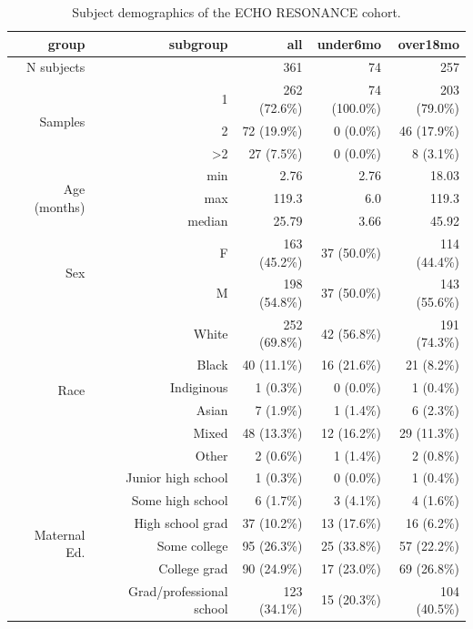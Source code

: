 \documentclass{article}
\begin{document}
\begin{table}[!htb]
    \centering
    \begin{tabular}{|r|r|r|r|r|}
      \hline\hline
      \textbf{group} & \textbf{subgroup} & \textbf{all} & \textbf{under6mo} & \textbf{over18mo} \\\hline
      N subjects &  & 361 & 74 & 257 \\  \hline
    \multirow{3}{*}{Samples} & 1 & 262 (72.6\%) & 74 (100.0\%) & 203 (79.0\%) \\ \cline{2-5}
         & 2 & 72 (19.9\%) & 0 (0.0\%) & 46 (17.9\%) \\ \cline{2-5}
         & \textgreater 2 & 27 (7.5\%) & 0 (0.0\%) & 8 (3.1\%) \\ \hline
    \multirow{3}{*}{Age (months)} & min & 2.76 & 2.76 & 18.03 \\ \cline{2-5}
         & max & 119.3 & 6.0 & 119.3 \\ \cline{2-5}
         & median & 25.79 & 3.66 & 45.92 \\ \hline
    \multirow{2}{*}{Sex} & F & 163 (45.2\%) & 37 (50.0\%) & 114 (44.4\%) \\   \cline{2-5}
                         & M & 198 (54.8\%) & 37 (50.0\%) & 143 (55.6\%) \\  \hline
    \multirow{6}{*}{Race} & White & 252 (69.8\%) & 42 (56.8\%) & 191 (74.3\%) \\   \cline{2-5}
        & Black & 40 (11.1\%) & 16 (21.6\%) & 21 (8.2\%) \\ \cline{2-5}
        & Indiginous & 1 (0.3\%) & 0 (0.0\%) & 1 (0.4\%) \\ \cline{2-5}
        & Asian & 7 (1.9\%) & 1 (1.4\%) & 6 (2.3\%) \\ \cline{2-5}
        & Mixed & 48 (13.3\%) & 12 (16.2\%) & 29 (11.3\%) \\ \cline{2-5}
        & Other & 2 (0.6\%) & 1 (1.4\%) & 2 (0.8\%) \\ \hline
    \multirow{6}{*}{Maternal Ed.} & Junior high school & 1 (0.3\%) & 0 (0.0\%) & 1 (0.4\%) \\   \cline{2-5}
        & Some high school & 6 (1.7\%) & 3 (4.1\%) & 4 (1.6\%) \\ \cline{2-5}
        & High school grad & 37 (10.2\%) & 13 (17.6\%) & 16 (6.2\%) \\ \cline{2-5}
        & Some college & 95 (26.3\%) & 25 (33.8\%) & 57 (22.2\%) \\ \cline{2-5}
        & College grad & 90 (24.9\%) & 17 (23.0\%) & 69 (26.8\%) \\ \cline{2-5}
        & Grad/professional school & 123 (34.1\%) & 15 (20.3\%) & 104 (40.5\%) \\\hline\hline
    \end{tabular}
    \caption{\label{tab:demo}Subject demographics of the ECHO RESONANCE cohort.}
\end{table}
\end{document}
